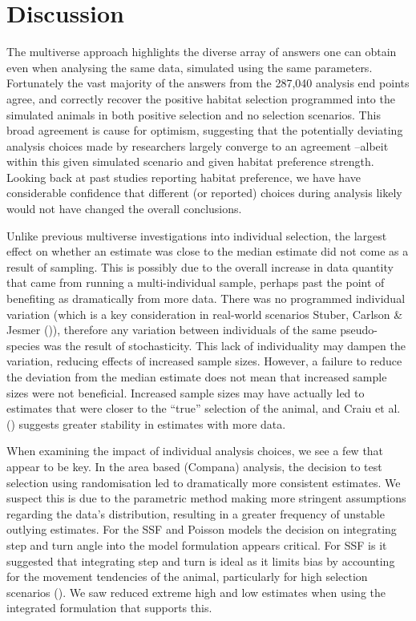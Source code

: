 \documentclass[10pt,a4paper]{article}
\begin{document}
\section{Discussion}\label{discussion}

The multiverse approach highlights the diverse array of answers one can obtain even when analysing the same data, simulated using the same parameters.
Fortunately the vast majority of the answers from the 287,040 analysis end points agree, and correctly recover the positive habitat selection programmed into the simulated animals in both positive selection and no selection scenarios.
This broad agreement is cause for optimism, suggesting that the potentially deviating analysis choices made by researchers largely converge to an agreement --albeit within this given simulated scenario and given habitat preference strength.
Looking back at past studies reporting habitat preference, we have have considerable confidence that different (or reported) choices during analysis likely would not have changed the overall conclusions.

Unlike previous multiverse investigations into individual selection, the largest effect on whether an estimate was close to the median estimate did not come as a result of sampling.
This is possibly due to the overall increase in data quantity that came from running a multi-individual sample, perhaps past the point of benefiting as dramatically from more data.
There was no programmed individual variation (which is a key consideration in real-world scenarios Stuber, Carlson \& Jesmer ()), therefore any variation between individuals of the same pseudo-species was the result of stochasticity.
This lack of individuality may dampen the variation, reducing effects of increased sample sizes.
However, a failure to reduce the deviation from the median estimate does not mean that increased sample sizes were not beneficial.
Increased sample sizes may have actually led to estimates that were closer to the ``true'' selection of the animal, and Craiu et al. () suggests greater stability in estimates with more data.

When examining the impact of individual analysis choices, we see a few that appear to be key.
In the area based (Compana) analysis, the decision to test selection using randomisation led to dramatically more consistent estimates.
We suspect this is due to the parametric method making more stringent assumptions regarding the data's distribution, resulting in a greater frequency of unstable outlying estimates.
For the SSF and Poisson models the decision on integrating step and turn angle into the model formulation appears critical.
For SSF is it suggested that integrating step and turn is ideal as it limits bias by accounting for the movement tendencies of the animal, particularly for high selection scenarios ().
We saw reduced extreme high and low estimates when using the integrated formulation that supports this.
\end{document}
